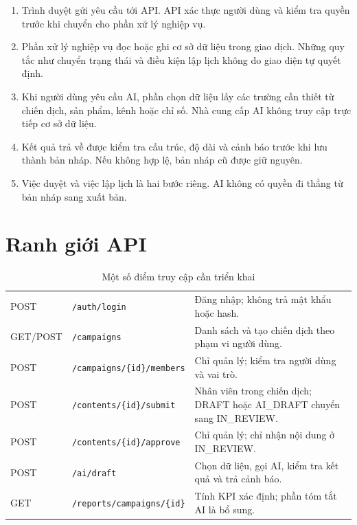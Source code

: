 \begin{enumerate}
\item Trình duyệt gửi yêu cầu tới API. API xác thực người dùng và kiểm tra quyền trước khi chuyển cho phần xử lý nghiệp vụ.
\item Phần xử lý nghiệp vụ đọc hoặc ghi cơ sở dữ liệu trong giao dịch. Những quy tắc như chuyển trạng thái và điều kiện lập lịch không do giao diện tự quyết định.
\item Khi người dùng yêu cầu AI, phần chọn dữ liệu lấy các trường cần thiết từ chiến dịch, sản phẩm, kênh hoặc chỉ số. Nhà cung cấp AI không truy cập trực tiếp cơ sở dữ liệu.
\item Kết quả trả về được kiểm tra cấu trúc, độ dài và cảnh báo trước khi lưu thành bản nháp. Nếu không hợp lệ, bản nháp cũ được giữ nguyên.
\item Việc duyệt và việc lập lịch là hai bước riêng. AI không có quyền đi thẳng từ bản nháp sang xuất bản.
\end{enumerate}

\section{Ranh giới API}

\begin{table}[h!]
\centering
\small
\caption{Một số điểm truy cập cần triển khai}
\label{tab:v8-api}
\begin{tabularx}{\textwidth}{|C{2.5cm}|L{5.0cm}|Y|}
\hline
{} &  & \\
\hline
POST & \texttt{/auth/login} & Đăng nhập; không trả mật khẩu hoặc hash.\\
\hline
GET/POST & \texttt{/campaigns} & Danh sách và tạo chiến dịch theo phạm vi người dùng.\\
\hline
POST & \texttt{/campaigns/\{id\}/members} & Chỉ quản lý; kiểm tra người dùng và vai trò.\\
\hline
POST & \texttt{/contents/\{id\}/submit} & Nhân viên trong chiến dịch; DRAFT hoặc AI\_DRAFT chuyển sang IN\_REVIEW.\\
\hline
POST & \texttt{/contents/\{id\}/approve} & Chỉ quản lý; chỉ nhận nội dung ở IN\_REVIEW.\\
\hline
POST & \texttt{/ai/draft} & Chọn dữ liệu, gọi AI, kiểm tra kết quả và trả cảnh báo.\\
\hline
GET & \texttt{/reports/campaigns/\{id\}} & Tính KPI xác định; phần tóm tắt AI là bổ sung.\\
\hline
\end{tabularx}
\end{table}

